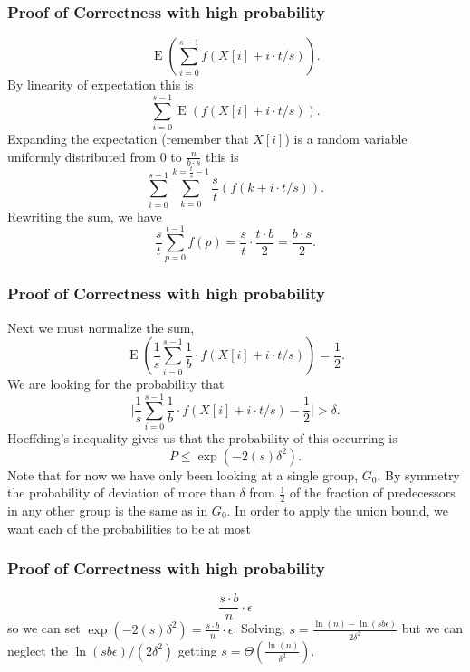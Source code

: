 \documentclass{beamer}
\def\E{\operatorname{E}}
\begin{document}
\begin{frame}
\frametitle{Proof of Correctness with high probability}
$$\E(\sum_{i=0}^{s-1}f(X[i]+i\cdot t/s)).$$
By linearity of expectation this is 
$$\sum_{i=0}^{s-1}\E(f(X[i]+i\cdot t/s)).$$
Expanding the expectation (remember that $X[i]$) is a random variable uniformly distributed from $0$ to $\frac{n}{b\cdot s}$ this is
$$\sum_{i=0}^{s-1}\sum_{k=0}^{k=\frac{t}{s}-1}\frac{s}{t}(f(k+i\cdot t/s)).$$
Rewriting the sum, we have
$$\frac{s}{t}\sum_{p=0}^{t-1}f(p) = \frac{s}{t}\cdot \frac{t\cdot b}{2} = \frac{b\cdot s}{2}.$$
\end{frame}

\begin{frame}
\frametitle{Proof of Correctness with high probability}
Next we must normalize the sum, 
$$\E(\frac{1}{s}\sum_{i=0}^{s-1}\frac{1}{b}\cdot f(X[i]+i\cdot t/s)) = \frac{1}{2}.$$
We are looking for the probability that 
$$\Big | \frac{1}{s}\sum_{i=0}^{s-1}\frac{1}{b}\cdot f(X[i]+i\cdot t/s) - \frac{1}{2} \Big | > \delta.$$
Hoeffding's inequality gives us that the probability of this occurring is 
$$P \leq \exp(-2(s)\delta^2).$$
Note that for now we have only been looking at a single group, $G_0$. By symmetry the probability of deviation of more than $\delta$ from $\frac{1}{2}$ of the fraction of predecessors in any other group is the same as in $G_0$. In order to apply the union bound, we want each of the probabilities to be at most 
\end{frame}

\begin{frame}
\frametitle{Proof of Correctness with high probability}
$$\frac{s\cdot b}{n}\cdot \epsilon$$
so we can set $\exp(-2(s)\delta^2) = \frac{s\cdot b}{n}\cdot \epsilon$.
Solving, $s = \frac{\ln(n)-\ln(sb\epsilon)}{2\delta^2}$
but we can neglect the $\ln(sb\epsilon) / (2\delta^2)$ getting $s =\Theta( \frac{\ln(n)}{\delta^2})$.
\end{frame}
\end{document}
